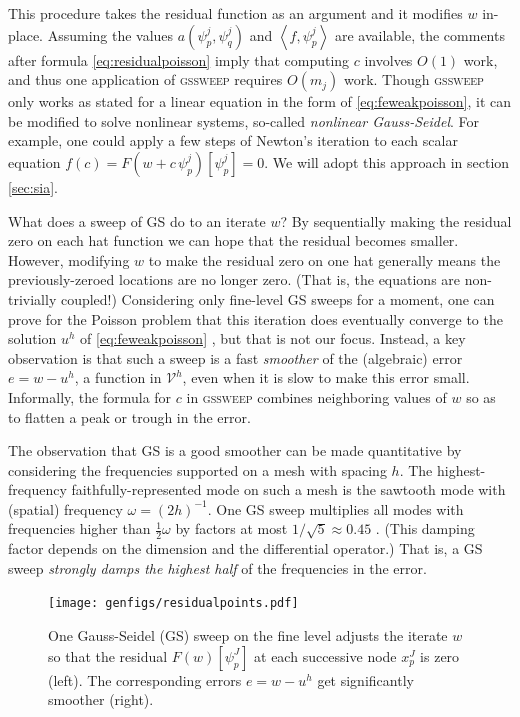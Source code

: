 \documentclass[letterpaper,final,12pt,reqno]{amsart}
\theoremstyle{claim}
\newcommand{\ip}[2]{\left<#1,#2\right>}
\numberwithin{equation}{section}
\numberwithin{figure}{section}
\numberwithin{table}{section}
\numberwithin{theorem}{section}
\begin{document}
This procedure takes the residual function as an argument and it modifies $w$ in-place.  Assuming the values $a(\psi_p^j,\psi_q^j)$ and $\ip{f}{\psi_p^j}$ are available, the comments after formula \eqref{eq:residualpoisson} imply that computing $c$ involves $O(1)$ work, and thus one application of \textsc{gssweep} requires $O(m_j)$ work.  Though \textsc{gssweep} only works as stated for a linear equation in the form of \eqref{eq:feweakpoisson}, it can be modified to solve nonlinear systems, so-called \emph{nonlinear Gauss-Seidel}.  For example, one could apply a few steps of Newton's iteration to each scalar equation $f(c) = F(w+c\,\psi_p^j)[\psi_p^j] = 0$.  We will adopt this approach in section \ref{sec:sia}.

What does a sweep of GS do to an iterate $w$?  By sequentially making the residual zero on each hat function we can hope that the residual becomes smaller.  However, modifying $w$ to make the residual zero on one hat generally means the previously-zeroed locations are no longer zero.  (That is, the equations are non-trivially coupled!)  Considering only fine-level GS sweeps for a moment, one can prove for the Poisson problem that this iteration does eventually converge to the solution $u^h$ of \eqref{eq:feweakpoisson} \cite[for example]{Greenbaum1997}, but that is not our focus.  Instead, a key observation is that such a sweep is a fast \emph{smoother} of the (algebraic) error $e=w-u^h$, a function in $\mathcal{V}^h$, even when it is slow to make this error small.  Informally, the formula for $c$ in \textsc{gssweep} combines neighboring values of $w$ so as to flatten a peak or trough in the error.

The observation that GS is a good smoother can be made quantitative by considering the frequencies supported on a mesh with spacing $h$.  The highest-frequency faithfully-represented mode on such a mesh is the sawtooth mode with (spatial) frequency $\omega=(2h)^{-1}$.  One GS sweep multiplies all modes with frequencies higher than $\frac{1}{2} \omega$ by factors at most $1/\sqrt{5}\approx 0.45$ \cite[Chapter 4]{Briggsetal2000}.  (This damping factor depends on the dimension and the differential operator.)  That is, a GS sweep \emph{strongly damps the highest half} of the frequencies in the error.

\begin{figure}[t]
\texttt{[image: genfigs/residualpoints.pdf]}
\caption{One Gauss-Seidel (GS) sweep on the fine level adjusts the iterate $w$ so that the residual $F(w)[\psi_p^J]$ at each successive node $x_p^J$ is zero (left).  The corresponding errors $e=w-u^h$ get significantly smoother (right).}
\label{fig:residualpoints}
\end{figure}
\end{document}
